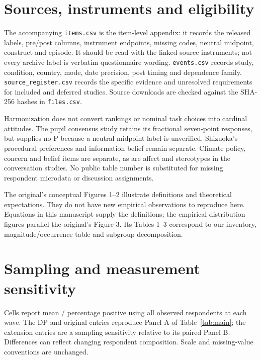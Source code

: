 \documentclass[11pt]{article}
\begin{document}
\section{Sources, instruments and eligibility}
\begin{table}[htbp]
\centering\small
\caption{Public archives used in this analysis}\label{tab:sources}

\end{table}
The accompanying \texttt{items.csv} is the item-level appendix: it records the
released labels, pre/post columns, instrument endpoints, missing codes, neutral
midpoint, construct and episode. It should be read with the linked source
instruments; not every archive label is verbatim questionnaire wording.
\texttt{events.csv} records study, condition, country, mode, date precision,
post timing and dependence family. \texttt{source\_register.csv} records the
specific evidence and unresolved requirements for included and deferred studies.
Source downloads are checked against the SHA-256 hashes in \texttt{files.csv}.

Harmonization does not convert rankings or nominal task choices into cardinal
attitudes. The pupil consensus study retains its fractional seven-point responses,
but supplies no P because a neutral midpoint label is unverified. Shizuoka's
procedural preferences and information belief remain separate. Climate policy,
concern and belief items are separate, as are affect and stereotypes in the
conversation studies. No public table number is substituted for missing respondent
microdata or discussion assignments.

The original's conceptual Figures 1--2 illustrate definitions and theoretical
expectations. They do not have new empirical observations to reproduce here.
Equations in this manuscript supply the definitions; the empirical distribution
figures parallel the original's Figure 3. Its Tables 1--3 correspond to our inventory,
magnitude/occurrence table and subgroup decomposition.

\section{Sampling and measurement sensitivity}\label{app:sensitivity}
\begin{landscape}
\begin{table}[p]
\centering\small
\caption{Full available-wave comparison and extension sampling sensitivity}

\begin{minipage}{.95\linewidth}\footnotesize
Cells report mean / percentage positive using all observed respondents at each
wave. The DP and original entries reproduce Panel A of Table~\ref{tab:main};
the extension entries are a sampling sensitivity relative to its paired Panel B.
Differences can reflect changing respondent composition. Scale and missing-value
conventions are unchanged.
\end{minipage}
\end{table}
\end{landscape}
\end{document}

